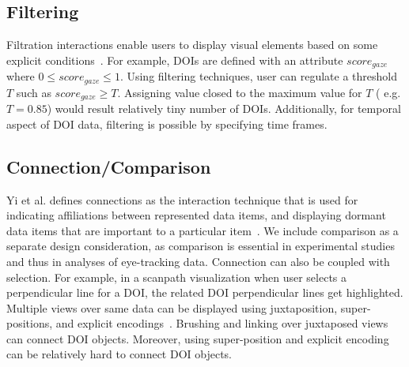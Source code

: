 	
\subsection{Filtering}
\label{sec:Filtering}

  Filtration interactions enable users to display visual elements based on some explicit conditions~\cite{yi2007toward}. For example, DOIs are defined with an attribute $score_{gaze}$ where $0 \leq score_{gaze} \leq 1$. Using filtering techniques, user can regulate a threshold $T$ such as $score_{gaze} \geq T$. Assigning value closed to the maximum value for $T$ ( e.g. $T =0.85$) would result relatively tiny number of DOIs. Additionally, for temporal aspect of DOI data, filtering is possible by specifying time frames. 	

	
\subsection{Connection/Comparison}
\label{sec:ConnectCompare}
 Yi et al. defines connections as the interaction technique that is used for indicating affiliations between represented data items, and displaying dormant data items that are important to a particular item~\cite{yi2007toward}.  We include comparison as a separate design consideration, as comparison is essential in experimental studies and thus in analyses of eye-tracking data. Connection can also be coupled with selection. For example, in a scanpath visualization when user selects a perpendicular line for a DOI, the related DOI perpendicular lines get highlighted. Multiple views over same data can be displayed using juxtaposition, super-positions, and explicit encodings~\cite{gleicher2011visual}. Brushing and linking over juxtaposed views can connect DOI objects. Moreover, using super-position and explicit encoding can be relatively hard to connect DOI objects. 

